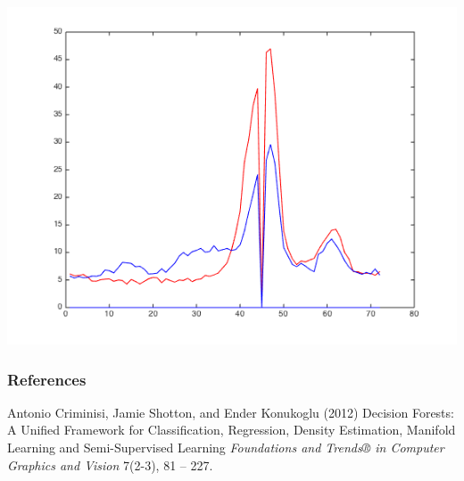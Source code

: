\documentclass{beamer}
\begin{document}
\begin{frame}
        \vspace{1mm}
        \includegraphics[scale=0.25]{contrastAgentResponses1.png} 

\end{frame}


\begin{frame}
    \frametitle{References}
    \footnotesize{
        \begin{thebibliography}{99} %
             Antonio Criminisi, Jamie Shotton, and Ender Konukoglu (2012)
            \newblock Decision Forests: A Unified Framework for Classification, Regression, Density Estimation, Manifold Learning and Semi-Supervised Learning
            \newblock \emph{Foundations and Trends® in Computer Graphics and Vision} 7(2-3), 81 -- 227.
        \end{thebibliography}
    }
\end{frame}
\end{document}
